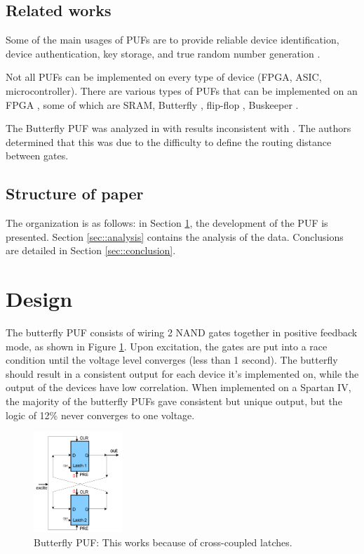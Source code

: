 \subsection{Related works}

	Some of the main usages of PUFs are to provide reliable device identification, device authentication, key storage, and true random number generation \cite{tehranipoor2011introduction}. 

	Not all PUFs can be implemented on every type of device (FPGA, ASIC, microcontroller). There are various types of PUFs that can be implemented on an FPGA \cite{VanHerrewege2015}, some of which are SRAM, Butterfly \cite{Kumar2008}, flip-flop \cite{Maes2008,Leest2010}, Buskeeper \cite{Simons2012}. 

	The Butterfly PUF was analyzed in \cite{morozov2010analysis} with results inconsistent with \cite{Kumar2008}. The authors determined that this was due to the difficulty to define the routing distance between gates. 


\subsection{Structure of paper}
	The organization is as follows: in Section \ref{sec::des_impl}, the development of the PUF is presented.  
	Section \ref{sec::analysis} contains the analysis of the data. Conclusions are detailed in Section \ref{sec::conclusion}. 


\section{Design} \label{sec::des_impl}
	The butterfly PUF consists of wiring 2 NAND gates together in positive feedback mode, as shown in Figure \ref{fig:bfly}. Upon excitation, the gates are put into a race condition until the voltage level converges (less than 1 second). The butterfly should result in a consistent output for each device it's implemented on, while the output of the devices have low correlation. When implemented on a Spartan IV, the majority of the butterfly PUFs gave consistent but unique output, but the logic of 12\% never converges to one voltage. 
		\begin{figure}[tbph]
			\centering
			\includegraphics[width=0.3\textwidth]{bfly.png}
			\caption{Butterfly PUF: This works because of cross-coupled latches.}\label{fig:bfly}
		\end{figure}

